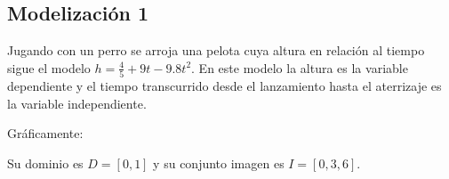 \subsection*{Modelización 1}

Jugando con un perro se arroja una pelota cuya altura en relación al tiempo sigue el modelo $h = \frac{4}{5} + 9t - 9.8t^2$. En este modelo la altura es la variable dependiente y el tiempo transcurrido desde el lanzamiento hasta el aterrizaje es la variable independiente.

Gráficamente:



Su dominio es $D = [0,1]$ y su conjunto imagen es $I = [0, 3,6]$.
